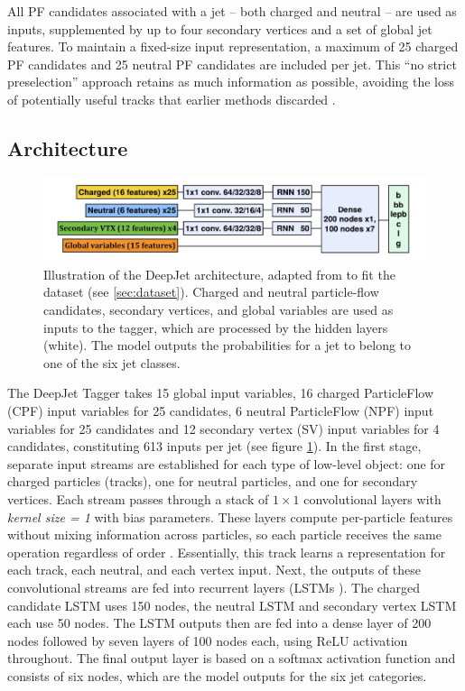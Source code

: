 All PF candidates associated with a jet – both charged and neutral – are used as inputs, supplemented by up to four secondary vertices and a set of global jet features. To maintain a fixed-size input representation, a maximum of 25 charged PF candidates and 25 neutral PF candidates are included per jet. This “no strict preselection” approach retains as much information as possible, avoiding the loss of potentially useful tracks that earlier methods discarded \cite{Bols_2020}.

\subsection{Architecture}

\begin{figure}[h]
    \centering
    \includegraphics[width=1\linewidth]{media/deepJet_architecture.png}
    \caption{Illustration of the DeepJet architecture, adapted from \cite{Bols_2020} to fit the dataset (see \ref{sec:dataset}). Charged and neutral particle-flow
candidates, secondary vertices, and global variables are used as inputs to the tagger, which are processed by the hidden layers (white). The model outputs the probabilities for a jet to belong to one of the six jet classes.}
    \label{fig:deepjetArchitecture}
\end{figure}

The DeepJet Tagger takes 15 global input variables, 16 charged ParticleFlow (CPF) input variables for 25 candidates, 6 neutral ParticleFlow (NPF) input variables for 25 candidates and 12 secondary vertex (SV) input variables for 4 candidates, constituting 613 inputs per jet (see figure \ref{fig:deepjetArchitecture}). In the first stage, separate input streams are established for each type of low-level object: one for charged particles (tracks), one for neutral particles, and one for secondary vertices. Each stream passes through a stack of $1\times1$ convolutional layers with \textit{kernel size = 1} with bias parameters. These layers compute per-particle features without mixing information across particles, so each particle receives the same operation regardless of order \cite{Bols_2020}. Essentially, this track learns a representation for each track, each neutral, and each vertex input. Next, the outputs of these convolutional streams are fed into recurrent layers (LSTMs \cite{Goodfellow-et-al-2016}). The charged candidate LSTM uses 150 nodes, the neutral LSTM and secondary vertex LSTM each use 50 nodes. The LSTM outputs then are fed into a dense layer of 200 nodes followed by seven layers of 100 nodes each, using ReLU activation throughout. The final output layer is based on a softmax activation function and consists of six nodes, which are the model outputs for the six jet categories.